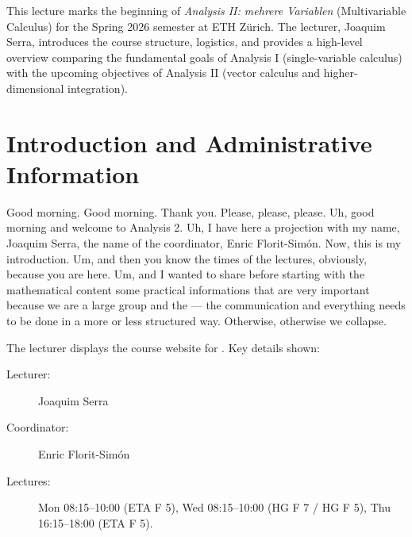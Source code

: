 %



\begin{nice-box}[Context]
This lecture marks the beginning of \emph{Analysis II: mehrere Variablen} (Multivariable Calculus) for the Spring 2026 semester at ETH Zürich. The lecturer, Joaquim Serra, introduces the course structure, logistics, and provides a high-level overview comparing the fundamental goals of Analysis I (single-variable calculus) with the upcoming objectives of Analysis II (vector calculus and higher-dimensional integration).
\end{nice-box}

\section{Introduction and Administrative Information}

\begin{spoken-clean}[00:00:00 - 00:01:20]
Good morning. Good morning. Thank you. Please, please, please. Uh, good morning and welcome to Analysis 2. Uh, I have here a projection with my name, Joaquim Serra, the name of the coordinator, Enric Florit-Simón. Now, this is my introduction. Um, and then you know the times of the lectures, obviously, because you are here. Um, and I wanted to share before starting with the mathematical content some practical informations that are very important because we are a large group and the — the communication and everything needs to be done in a more or less structured way. Otherwise, otherwise we collapse.
\end{spoken-clean}

\begin{meta-note}
The lecturer displays the course website for . Key details shown:
\begin{description}
    \item[Lecturer:] Joaquim Serra
    \item[Coordinator:] Enric Florit-Simón
    \item[Lectures:] Mon 08:15--10:00 (ETA F 5), Wed 08:15--10:00 (HG F 7 / HG F 5), Thu 16:15--18:00 (ETA F 5).
\end{description}
\end{meta-note}

